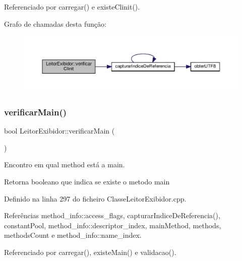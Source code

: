 Referenciado por carregar() e existe\+Clinit().

Grafo de chamadas desta função\+:
\nopagebreak
\begin{figure}[H]
\begin{center}
\leavevmode
\includegraphics[width=350pt]{classLeitorExibidor_a8aeff3d072e77288215e5a070e958cf0_cgraph}
\end{center}
\end{figure}
\mbox{\label{classLeitorExibidor_a2d486c9289a5d50a7fb00afffd2fa760}} 
\subsubsection{\texorpdfstring{verificar\+Main()}{verificarMain()}}
{\footnotesize\ttfamily bool Leitor\+Exibidor\+::verificar\+Main (\begin{DoxyParamCaption}{ }\end{DoxyParamCaption})\hspace{0.3cm}{\ttfamily [private]}}



Encontro em qual method está a main. 

\begin{DoxyReturn}{Retorna}
booleano que indica se existe o metodo main 
\end{DoxyReturn}


Definido na linha 297 do ficheiro Classe\+Leitor\+Exibidor.\+cpp.



Referências method\+\_\+info\+::access\+\_\+flags, capturar\+Indice\+De\+Referencia(), constant\+Pool, method\+\_\+info\+::descriptor\+\_\+index, main\+Method, methods, methods\+Count e method\+\_\+info\+::name\+\_\+index.



Referenciado por carregar(), existe\+Main() e validacao().

